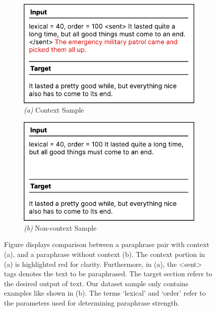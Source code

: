 \documentclass{l4proj}
\theoremstyle{definition}
\begin{document}
        \begin{figure}[ht]
            \centering
            \captionsetup[subfigure]{labelformat=empty}
            \begin{subfigure}{.5\textwidth}
                \centering
                \includegraphics[width=.9\linewidth]{images/methods/kpar3-context-sample.pdf}
                \caption{\emph{(a)} Context Sample}
                \label{fig:kpar3-context}
            \end{subfigure}%
            \begin{subfigure}{.5\textwidth}
                \centering
                \includegraphics[width=0.9\linewidth]{images/methods/kpar3-non-context-sample.pdf}
                \caption{\emph{(b)} Non-context Sample}
                \label{fig:kpar3-non-context}
            \end{subfigure}
            \caption{Figure displays comparison between a paraphrase pair with context (a), and a paraphrase without context (b). The context portion in (a) is highlighted red for clarity. Furthermore, in (a), the <sent> tags denotes the text to be paraphrased. The target section refers to the desired output of text. Our dataset sample only contains examples like shown in (b). The terms `lexical' and `order' refer to the parameters used for determining paraphrase strength.}
            \label{fig:kpar3-sample-comparison}
        \end{figure}
        
\end{document}
